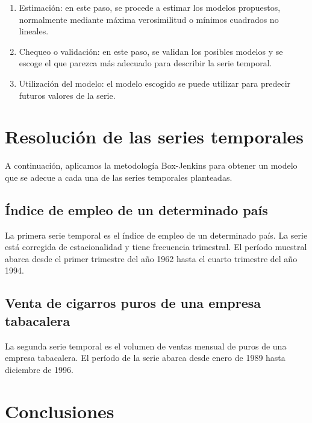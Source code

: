 \documentclass[12pt,a4paper,twoside,openright,titlepage,final]{article}
\begin{document}
\begin{enumerate}
	\item Estimación: en este paso, se procede a estimar los modelos propuestos, normalmente mediante máxima verosimilitud o mínimos cuadrados no lineales. 
	
	\item Chequeo o validación: en este paso, se validan los posibles modelos y se escoge el que parezca más adecuado para describir la serie temporal.
	
	\item Utilización del modelo: el modelo escogido se puede utilizar para predecir futuros valores de la serie.
\end{enumerate}

\section{Resolución de las series temporales}

A continuación, aplicamos la metodología Box-Jenkins para obtener un modelo que se adecue a cada una de las series temporales planteadas. 

\subsection{Índice de empleo de un determinado país}

La primera serie temporal es el índice de empleo de un determinado país. La serie está corregida de estacionalidad y tiene frecuencia trimestral. El período muestral abarca desde el primer trimestre del año 1962 hasta el cuarto trimestre del año 1994.\\

 

\subsection{Venta de cigarros puros de una empresa tabacalera}

La segunda serie temporal es el volumen de ventas mensual de puros de una empresa tabacalera. El período de la serie abarca desde enero de 1989 hasta diciembre de 1996.

\section{Conclusiones}
\end{document}
